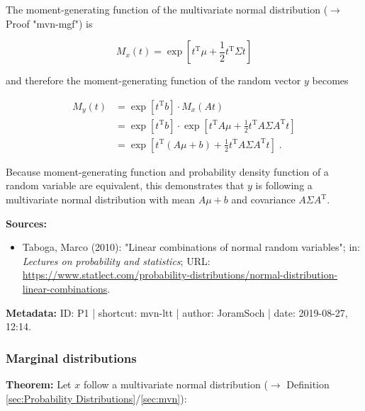 \documentclass[a4paper,12pt,twoside]{book}
\begin{document}
The moment-generating function of the multivariate normal distribution ($\rightarrow$ Proof "mvn-mgf") is

\begin{equation} \label{eq:mvn-ltt-mvn-mgf}
M_x(t) = \exp \left[ t^\mathrm{T} \mu + \frac{1}{2} t^\mathrm{T} \Sigma t \right]
\end{equation}

and therefore the moment-generating function of the random vector $y$ becomes

\begin{equation} \label{eq:mvn-ltt-y-mgf-s2}
\begin{split}
M_y(t) &= \exp \left[ t^\mathrm{T} b \right] \cdot M_x(At) \\
&= \exp \left[ t^\mathrm{T} b \right] \cdot \exp \left[ t^\mathrm{T} A \mu + \frac{1}{2} t^\mathrm{T} A \Sigma A^\mathrm{T} t \right] \\
&= \exp \left[ t^\mathrm{T} \left( A \mu + b \right) + \frac{1}{2} t^\mathrm{T} A \Sigma A^\mathrm{T} t \right] \; .
\end{split}
\end{equation}

Because moment-generating function and probability density function of a random variable are equivalent, this demonstrates that $y$ is following a multivariate normal distribution with mean $A \mu + b$ and covariance $A \Sigma A^\mathrm{T}$.


\vspace{1em}
\textbf{Sources:}
\begin{itemize}
\item Taboga, Marco (2010): "Linear combinations of normal random variables"; in: \textit{Lectures on probability and statistics}; URL: \url{https://www.statlect.com/probability-distributions/normal-distribution-linear-combinations}.
\end{itemize}


\vspace{1em}
\textbf{Metadata:} ID: P1 | shortcut: mvn-ltt | author: JoramSoch | date: 2019-08-27, 12:14.
\vspace{1em}



\subsubsection[\textbf{Marginal distributions}]{Marginal distributions} \label{sec:mvn-marg}
\setcounter{equation}{0}

\textbf{Theorem:} Let $x$ follow a multivariate normal distribution ($\rightarrow$ Definition \ref{sec:Probability Distributions}/\ref{sec:mvn}):
\end{document}
